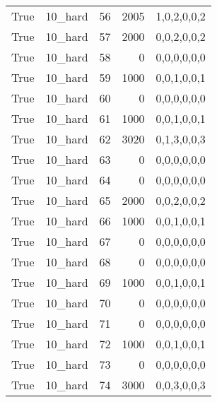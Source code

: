 \begin{tabular}{llrrl}
 True            & 10\_hard             &            56 &                  2005 & 1,0,2,0,0,2   \\
 True            & 10\_hard             &            57 &                  2000 & 0,0,2,0,0,2   \\
 True            & 10\_hard             &            58 &                     0 & 0,0,0,0,0,0   \\
 True            & 10\_hard             &            59 &                  1000 & 0,0,1,0,0,1   \\
 True            & 10\_hard             &            60 &                     0 & 0,0,0,0,0,0   \\
 True            & 10\_hard             &            61 &                  1000 & 0,0,1,0,0,1   \\
 True            & 10\_hard             &            62 &                  3020 & 0,1,3,0,0,3   \\
 True            & 10\_hard             &            63 &                     0 & 0,0,0,0,0,0   \\
 True            & 10\_hard             &            64 &                     0 & 0,0,0,0,0,0   \\
 True            & 10\_hard             &            65 &                  2000 & 0,0,2,0,0,2   \\
 True            & 10\_hard             &            66 &                  1000 & 0,0,1,0,0,1   \\
 True            & 10\_hard             &            67 &                     0 & 0,0,0,0,0,0   \\
 True            & 10\_hard             &            68 &                     0 & 0,0,0,0,0,0   \\
 True            & 10\_hard             &            69 &                  1000 & 0,0,1,0,0,1   \\
 True            & 10\_hard             &            70 &                     0 & 0,0,0,0,0,0   \\
 True            & 10\_hard             &            71 &                     0 & 0,0,0,0,0,0   \\
 True            & 10\_hard             &            72 &                  1000 & 0,0,1,0,0,1   \\
 True            & 10\_hard             &            73 &                     0 & 0,0,0,0,0,0   \\
 True            & 10\_hard             &            74 &                  3000 & 0,0,3,0,0,3   \\

\end{tabular}
